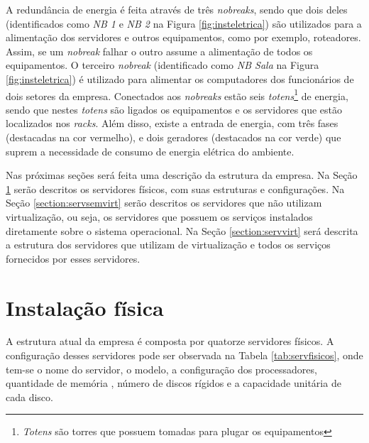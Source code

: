 A redundância de energia é feita através de três \textit{nobreaks}, sendo que dois deles (identificados como \textit{NB 1} e \textit{NB 2} na 
Figura \ref{fig:insteletrica}) são utilizados para a alimentação dos servidores e outros equipamentos, como por exemplo, roteadores. Assim, se um 
\textit{nobreak} falhar o outro assume a alimentação de todos os equipamentos. O terceiro \textit{nobreak} (identificado como \textit{NB Sala} 
na Figura \ref{fig:insteletrica}) é utilizado para alimentar os computadores dos funcionários de dois setores da empresa. Conectados aos 
\textit{nobreaks} estão seis \textit{totens}\footnote[1]{\textit{Totens} são torres que possuem tomadas para plugar os equipamentos} de energia, 
sendo que nestes \textit{totens} são ligados os equipamentos e os servidores que estão localizados nos \textit{racks}. Além disso, existe a 
entrada de energia, com três fases (destacadas na cor vermelho), e dois geradores (destacados na cor verde) que suprem a necessidade de consumo 
de energia elétrica do ambiente.

Nas próximas seções será feita uma descrição da estrutura da empresa. Na Seção \ref{section:fisico} serão descritos os servidores físicos, com 
suas estruturas e configurações. Na Seção \ref{section:servsemvirt} serão descritos os servidores que não utilizam virtualização, ou seja, 
os servidores que possuem os serviços instalados diretamente sobre o sistema operacional. Na Seção \ref{section:servvirt} será descrita a 
estrutura dos servidores que utilizam de virtualização e todos os serviços fornecidos por esses servidores.

\section{Instalação física}
\label{section:fisico}

A estrutura atual da empresa é composta por quatorze servidores físicos. A configuração desses servidores pode ser observada na 
Tabela \ref{tab:servfisicos}, onde tem-se o nome do servidor, o modelo, a configuração dos processadores, quantidade de memória
, número de discos rígidos e a capacidade unitária de cada disco.

